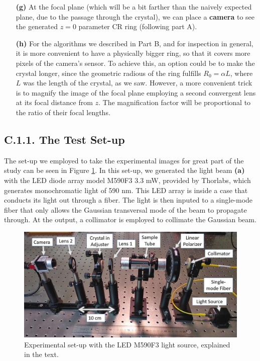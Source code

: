 \documentclass[11pt, a4paper, twoside]{article} %
\begin{document}
\begin{itemize}
\item[\bf (g)] At the focal plane (which will be a bit farther than the naively expected plane, due to the passage through the crystal), we can place a {\bf camera} to see the generated $z=0$ parameter CR ring (following part A).

\item[\bf (h)] For the algorithms we described in Part B, and for inspection in general, it is more convenient to have a physically bigger ring, so that it covers more pixels of the camera's sensor. To achieve this, an option could be to make the crystal longer, since the geometric radious of the ring fulfills $R_0=\alpha L$, where $L$ was the length of the crystal, as we saw. However, a more convenient trick is to magnify the image of the focal plane employing a second convergent lens at its focal distance from $z$. The magnification factor will be proportional to the ratio of their focal lengths.
\end{itemize}

\subsection*{C.1.1. The Test Set-up}

The set-up we employed to take the experimental images for great part of the study can be seen in Figure \ref{fig:track_setup}. In this set-up, we generated the light beam {\bf (a)} with the LED diode array model M590F3 3.3 mW, provided by Thorlabs, which generates monochromatic light of 590 nm. This LED array is inside a case that conducts its light out through a fiber. The light is then inputed to a single-mode fiber that only allows the Gaussian transversal mode of the beam to propagate through. At the output, a collimator is employed to collimate the Gaussian beam.

\begin{figure}[h!] 
     \centering 
    \includegraphics[width=0.55\linewidth]{setup.jpg}
    \caption{ Experimental set-up with the LED M590F3 light source, explained in the text.  }
    \label{fig:track_setup}
\end{figure}
\end{document}
